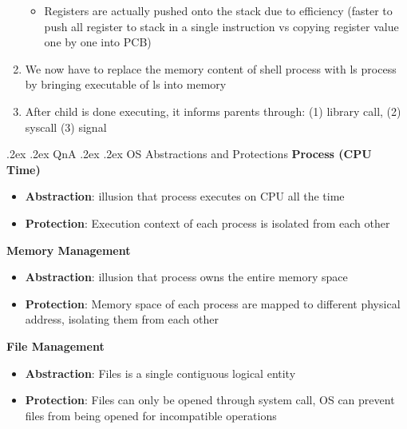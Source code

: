 \documentclass[13pt,landscape,a4paper]{article}
\makeatletter
\renewcommand{\section}{\@startsection{section}{1}{0mm}%
    {.2ex}%
    {.2ex}%
    {\color{myblue}\sffamily\small\bfseries}}
\renewcommand{\subsection}{\@startsection{subsection}{1}{0mm}%
    {.2ex}%
    {.2ex}%
    {\sffamily\bfseries}}
\makeatother
\begin{document}
\begin{multicols*}{3}
\begin{enumerate}
            \begin{itemize}
                \item Registers are actually pushed onto the stack due to efficiency (faster to push all register to stack in a single instruction vs copying register value one by one into PCB)
            \end{itemize}
            \item We now have to replace the memory content of shell process with ls process by bringing executable of ls into memory
            \item After child is done executing, it informs parents through: (1) library call, (2) syscall (3) signal
        \end{enumerate}
        \columnbreak
        \section{QnA}
        \subsection{OS Abstractions and Protections}
        \textbf{Process (CPU Time)}
        \begin{itemize}
            \item \textbf{Abstraction}: illusion that process executes on CPU all the time
            \item \textbf{Protection}: Execution context of each process is isolated from each other
        \end{itemize}
        \textbf{Memory Management}
        \begin{itemize}
            \item \textbf{Abstraction}: illusion that process owns the entire memory space
            \item \textbf{Protection}: Memory space of each process are mapped to different physical address, isolating them from each other
        \end{itemize}
        \textbf{File Management}
        \begin{itemize}
            \item \textbf{Abstraction}: Files is a single contiguous logical entity
            \item \textbf{Protection}: Files can only be opened through system call, OS can prevent files from being opened for incompatible operations
        \end{itemize}

\end{multicols*}
\end{document}
